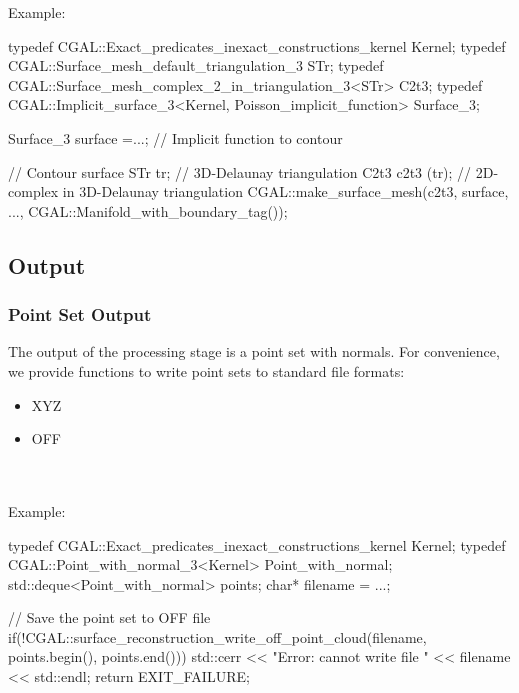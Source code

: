 Example:

\begin{ccExampleCode}
typedef CGAL::Exact_predicates_inexact_constructions_kernel Kernel;
typedef CGAL::Surface_mesh_default_triangulation_3 STr;
typedef CGAL::Surface_mesh_complex_2_in_triangulation_3<STr> C2t3;
typedef CGAL::Implicit_surface_3<Kernel, Poisson_implicit_function> Surface_3;

Surface_3 surface =...; // Implicit function to contour

// Contour surface
STr tr; // 3D-Delaunay triangulation
C2t3 c2t3 (tr); // 2D-complex in 3D-Delaunay triangulation
CGAL::make_surface_mesh(c2t3, surface, ..., CGAL::Manifold_with_boundary_tag());
\end{ccExampleCode}


\subsection{Output}

\subsubsection{Point Set Output}

The output of the processing stage is a point set with normals.
For convenience, we provide functions to write point sets to standard file formats:

\begin{itemize}
\item XYZ
\item OFF
\end{itemize}

  \\
  \\

Example:

\begin{ccExampleCode}
typedef CGAL::Exact_predicates_inexact_constructions_kernel Kernel;
typedef CGAL::Point_with_normal_3<Kernel> Point_with_normal;
std::deque<Point_with_normal> points;
char* filename = ...;

// Save the point set to OFF file
if(!CGAL::surface_reconstruction_write_off_point_cloud(filename,
                                                       points.begin(), points.end()))
{
  std::cerr << "Error: cannot write file " << filename << std::endl;
  return EXIT_FAILURE;
}
\end{ccExampleCode}


